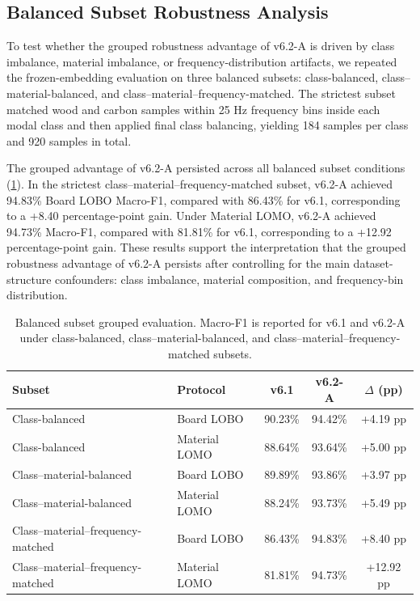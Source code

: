 \documentclass[review,3p,times]{elsarticle}
\begin{document}
\subsection{Balanced Subset Robustness Analysis}
To test whether the grouped robustness advantage of v6.2-A is driven by class imbalance, material imbalance, or frequency-distribution artifacts, we repeated the frozen-embedding evaluation on three balanced subsets: class-balanced, class--material-balanced, and class--material--frequency-matched. The strictest subset matched wood and carbon samples within 25 Hz frequency bins inside each modal class and then applied final class balancing, yielding 184 samples per class and 920 samples in total.

The grouped advantage of v6.2-A persisted across all balanced subset conditions (\cref{tab:balanced_subset}). In the strictest class--material--frequency-matched subset, v6.2-A achieved 94.83\% Board LOBO Macro-F1, compared with 86.43\% for v6.1, corresponding to a +8.40 percentage-point gain. Under Material LOMO, v6.2-A achieved 94.73\% Macro-F1, compared with 81.81\% for v6.1, corresponding to a +12.92 percentage-point gain. These results support the interpretation that the grouped robustness advantage of v6.2-A persists after controlling for the main dataset-structure confounders: class imbalance, material composition, and frequency-bin distribution.

\begin{table}[htbp]
\centering
\caption{Balanced subset grouped evaluation. Macro-F1 is reported for v6.1 and v6.2-A under class-balanced, class--material-balanced, and class--material--frequency-matched subsets.}
\label{tab:balanced_subset}
\begin{tabular}{llccc}
\toprule
\textbf{Subset} & \textbf{Protocol} & \textbf{v6.1} & \textbf{v6.2-A} & \textbf{$\Delta$ (pp)} \\
\midrule
Class-balanced & Board LOBO & 90.23\% & 94.42\% & +4.19 pp \\
Class-balanced & Material LOMO & 88.64\% & 93.64\% & +5.00 pp \\
Class--material-balanced & Board LOBO & 89.89\% & 93.86\% & +3.97 pp \\
Class--material-balanced & Material LOMO & 88.24\% & 93.73\% & +5.49 pp \\
Class--material--frequency-matched & Board LOBO & 86.43\% & 94.83\% & +8.40 pp \\
Class--material--frequency-matched & Material LOMO & 81.81\% & 94.73\% & +12.92 pp \\
\bottomrule
\end{tabular}
\end{table}
\end{document}
